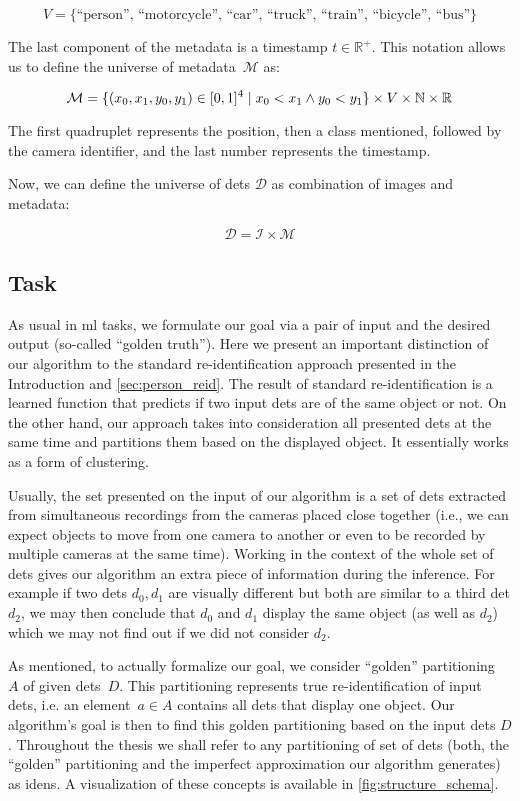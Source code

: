 $$V = \{\text{``person'', ``motorcycle'', ``car'', ``truck'', ``train'', ``bicycle'', ``bus''\}}$$


The last component of the metadata is a timestamp $t \in \mathbb{R}^+$. This notation allows us to define the universe of metadata~$\mathcal{M}$ as:

$$\mathcal{M} = \{{(x_0, x_1, y_0, y_1) \in [0,1]^4 \mid x_0 < x_1 \land y_0 < y_1}\} \times V \times \mathbb{N} \times \mathbb{R}$$

The first quadruplet represents the position, then a class mentioned, followed by the camera identifier, and the last number represents the timestamp.

Now, we can define the universe of \glspl{det} $\mathcal{D}$ as combination of images and metadata:

$$\mathcal{D} = \mathcal{I \times M}$$

\subsection{Task}

\label{ssec:task}

As usual in \gls{ml} tasks, we formulate our goal via a pair of input and the desired output (so-called ``golden truth''). Here we present an important distinction of our algorithm to the standard re-identification approach presented in the Introduction and \autoref{sec:person_reid}. The result of standard re-identification is a learned function that predicts if two input \glspl{det} are of the same object or not. On the other hand, our approach takes into consideration all presented \glspl{det} at the same time and partitions them based on the displayed object. It essentially works as a form of clustering.

Usually, the set presented on the input of our algorithm is a set of \glspl{det} extracted from simultaneous recordings from the cameras placed close together (i.e., we can expect objects to move from one camera to another or even to be recorded by multiple cameras at the same time). Working in the context of the whole set of \glspl{det} gives our algorithm an extra piece of information during the inference. For example if two \glspl{det} $d_0, d_1$ are visually different but both are similar to a third \gls{det} $d_2$, we may then conclude that $d_0$ and $d_1$ display the same object (as well as $d_2$) which we may not find out if we did not consider $d_2$.


As mentioned, to actually formalize our goal, we consider ``golden'' partitioning~$A$ of given \glspl{det}~$D$. This partitioning represents true re-identification of input \glspl{det}, i.e. an element~$a \in A$ contains all \glspl{det} that display one object. Our algorithm's goal is then to find this golden partitioning based on the input \glspl{det} $D$. Throughout the thesis we shall refer to any partitioning of set of \glspl{det} (both, the ``golden'' partitioning and the imperfect approximation our algorithm generates) as \glspl{iden}. A visualization of these concepts is available in \autoref{fig:structure_schema}.


